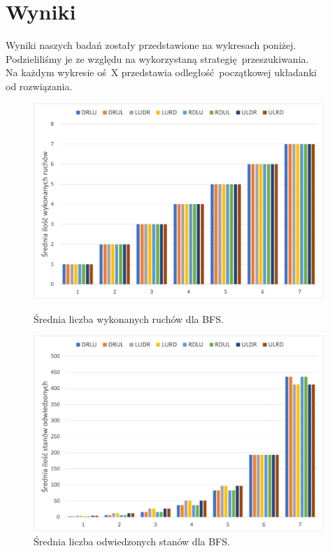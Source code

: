 \documentclass{classrep}
\begin{document}
\section{Wyniki}
Wyniki naszych badań zostały przedstawione na wykresach poniżej. \\
Podzieliliśmy je ze względu na wykorzystaną strategię przeszukiwania.\\ 
Na każdym wykresie oś X przedstawia odległość początkowej układanki \\
od rozwiązania.
\begin{figure}[ht]
	\includegraphics[width=11cm]{BFS/BFS_śr_ruchów}
	\centering
	\captionsetup{name=Wykres}
	\caption{Średnia liczba wykonanych ruchów dla BFS.}
		
	\includegraphics[width=11cm]{BFS/BFS_odwiedzone}
	\centering
	\captionsetup{name=Wykres}
	\caption{Średnia liczba odwiedzonych stanów dla BFS.}
\end{figure}
\end{document}
